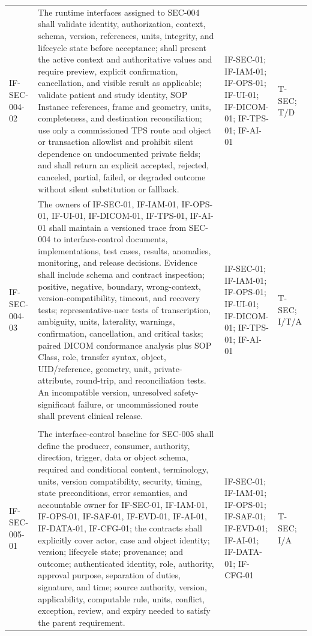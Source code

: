 \documentclass[11pt,letterpaper]{article}
\begin{document}
\begin{scriptsize}
\begin{longtable}{@{}L{0.14\textwidth}L{0.49\textwidth}L{0.19\textwidth}L{0.10\textwidth}@{}}
\mbox{IF-SEC-004-02} & The runtime interfaces assigned to SEC-004 shall validate identity, authorization, context, schema, version, references, units, integrity, and lifecycle state before acceptance; shall present the active context and authoritative values and require preview, explicit confirmation, cancellation, and visible result as applicable; validate patient and study identity, SOP Instance references, frame and geometry, units, completeness, and destination reconciliation; use only a commissioned TPS route and object or transaction allowlist and prohibit silent dependence on undocumented private fields; and shall return an explicit accepted, rejected, canceled, partial, failed, or degraded outcome without silent substitution or fallback. & IF-SEC-01; IF-IAM-01; IF-OPS-01; IF-UI-01; IF-DICOM-01; IF-TPS-01; IF-AI-01 & T-SEC; T\slash\allowbreak{}D \\
\addlinespace[2pt]
\mbox{IF-SEC-004-03} & The owners of IF-SEC-01, IF-IAM-01, IF-OPS-01, IF-UI-01, IF-DICOM-01, IF-TPS-01, IF-AI-01 shall maintain a versioned trace from SEC-004 to interface-control documents, implementations, test cases, results, anomalies, monitoring, and release decisions. Evidence shall include schema and contract inspection; positive, negative, boundary, wrong-context, version-compatibility, timeout, and recovery tests; representative-user tests of transcription, ambiguity, units, laterality, warnings, confirmation, cancellation, and critical tasks; paired DICOM conformance analysis plus SOP Class, role, transfer syntax, object, UID\slash\allowbreak{}reference, geometry, unit, private-attribute, round-trip, and reconciliation tests. An incompatible version, unresolved safety-significant failure, or uncommissioned route shall prevent clinical release. & IF-SEC-01; IF-IAM-01; IF-OPS-01; IF-UI-01; IF-DICOM-01; IF-TPS-01; IF-AI-01 & T-SEC; I\slash\allowbreak{}T\slash\allowbreak{}A \\
\addlinespace[2pt]
 \\
\addlinespace[2pt]
\mbox{IF-SEC-005-01} & The interface-control baseline for SEC-005 shall define the producer, consumer, authority, direction, trigger, data or object schema, required and conditional content, terminology, units, version compatibility, security, timing, state preconditions, error semantics, and accountable owner for IF-SEC-01, IF-IAM-01, IF-OPS-01, IF-SAF-01, IF-EVD-01, IF-AI-01, IF-DATA-01, IF-CFG-01; the contracts shall explicitly cover actor, case and object identity; version; lifecycle state; provenance; and outcome; authenticated identity, role, authority, approval purpose, separation of duties, signature, and time; source authority, version, applicability, computable rule, units, conflict, exception, review, and expiry needed to satisfy the parent requirement. & IF-SEC-01; IF-IAM-01; IF-OPS-01; IF-SAF-01; IF-EVD-01; IF-AI-01; IF-DATA-01; IF-CFG-01 & T-SEC; I\slash\allowbreak{}A \\

\end{longtable}
\end{scriptsize}
\end{document}
